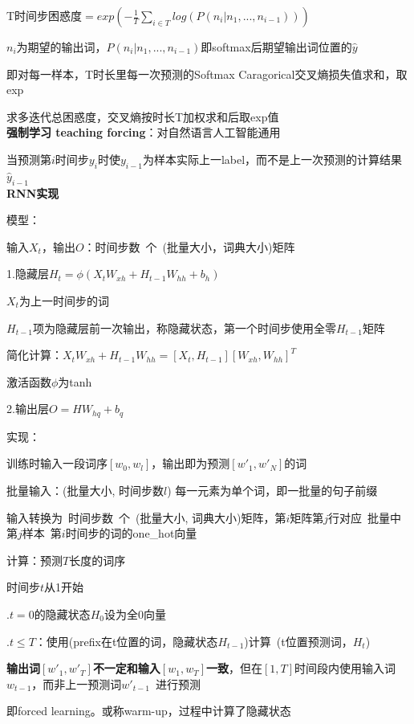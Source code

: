 \documentclass[UTF8]{ctexart}
\begin{document}
  T时间步困惑度$ = exp(-\frac{1}{T}\sum_{i \in T} log(P(n_i | n_1, ..., n_{i-1})))$

  \quad $n_i$为期望的输出词，$P(n_i | n_1, ..., n_{i-1})$即softmax后期望输出词位置的$\hat{y}$

  \quad 即对每一样本，T时长里每一次预测的Softmax Caragorical交叉熵损失值求和，取exp
  
  求多迭代总困惑度，交叉熵按时长T加权求和后取exp值\\
\textbf{强制学习 teaching forcing}：对自然语言人工智能通用

  当预测第$i$时间步$y_i$时使$y_{i-1}$为样本实际上一label，而不是上一次预测的计算结果$\hat{y}_{i-1}$\\
\textbf{RNN实现}

  模型：

  \quad 输入$X_t$，输出$O$：时间步数\ 个\ (批量大小，词典大小)矩阵

  \quad 1.隐藏层$H_t = \phi(X_tW_{xh} + H_{t-1}W_{hh} + b_h)$

  \quad \quad $X_t$为上一时间步的词

  \quad \quad $H_{t-1}$项为隐藏层前一次输出，称隐藏状态，第一个时间步使用全零$H_{t-1}$矩阵

  \quad \quad 简化计算：$X_tW_{xh} + H_{t-1}W_{hh} = [X_t, H_{t-1}][W_{xh}, W_{hh}]^T$

  \quad \quad 激活函数$\phi$为tanh

  \quad 2.输出层$O = HW_{hq} + b_q$
  
  实现：

  \quad 训练时输入一段词序$[w_{0}, w_{l}]$，输出即为预测$[w'_{1}, w'_N]$的词
  
  \quad 批量输入：(批量大小, 时间步数$l$) 每一元素为单个词，即一批量的句子前缀
  
  \quad \quad 输入转换为\ 时间步数\ 个\ (批量大小, 词典大小)矩阵，第$i$矩阵第$j$行对应\ 批量中第$j$样本\ 第$i$时间步的词的one\_hot向量
    
  \quad 计算：预测$T$长度的词序

  \quad \quad 时间步$t$从1开始

  \quad {}.$t = 0$的隐藏状态$H_0$设为全0向量

  \quad {}.$t \leq T$：使用(prefix在t位置的词，隐藏状态$H_{t-1}$)计算\ (t位置预测词，$H_t$)

  \quad \quad \quad \textbf{输出词$[w'_{1}, w'_{T}]$不一定和输入$[w_1, w_T]$一致}，但在$[1, T]$时间段内使用输入词$w_{t-1}$，而非上一预测词$w'_{t-1}$\ 进行预测

  \quad \quad \quad 即forced learning。或称warm-up，过程中计算了隐藏状态
  
\end{document}
